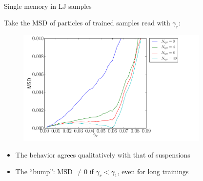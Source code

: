 \documentclass[compress]{beamer}
\begin{document}
	\begin{frame}{Single memory in LJ samples}

		Take the MSD of particles of trained samples read with $\gamma_{r}$:

		\begin{figure}
			\includegraphics[width=0.85\textwidth]{Graphics/Graphs/MemoryKASingle}
		\end{figure}
		
		\begin{itemize}
			\item<2-> The behavior agrees qualitatively with that of suspensions
			\item<3-> The ``bump'': MSD $\neq 0$ if $\gamma_{r} < \gamma_{1}$, even for long trainings
		\end{itemize}
		
	\end{frame}	
\end{document}
